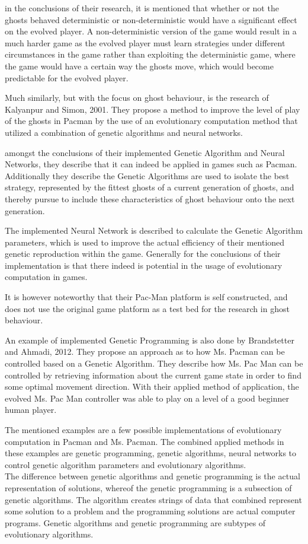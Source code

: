 in the conclusions of their research, it is mentioned that whether or not the ghosts behaved deterministic or non-deterministic would have a significant effect on the evolved player. A non-deterministic version of the game would result in a much harder game  as the evolved player must learn strategies under different circumstances in the game rather than exploiting the deterministic game, where the game would have a certain way the ghosts move, which would become predictable for the evolved player.\cite[pp. 8]{Lucas2005}

Much similarly, but with the focus on ghost behaviour, is the research of Kalyanpur and Simon, 2001. They propose a method to improve the level of play of the ghosts in Pacman by the use of an evolutionary computation method that utilized a combination of genetic algorithms and neural networks. \cite{Kalyanpur2001}

amongst the conclusions of their implemented Genetic Algorithm and Neural Networks, they describe that it can indeed be applied in games such as Pacman. Additionally they describe the Genetic Algorithms are used to isolate the best strategy, represented by the fittest ghosts of a current generation of ghosts, and thereby pursue to include these characteristics of ghost behaviour onto the next generation. \cite[pp. 8]{Kalyanpur2001}

The implemented Neural Network is described to calculate the Genetic Algorithm parameters, which is used to improve the actual efficiency of their mentioned genetic reproduction within the game. Generally for the conclusions of their implementation is that there indeed is potential in the usage of evolutionary computation in games.

It is however noteworthy that their Pac-Man platform is self constructed, and does not use the original game platform as a test bed for the research in ghost behaviour.

An example of implemented Genetic Programming is also done by Brandstetter and Ahmadi, 2012. They propose an approach as to how Ms. Pacman can be controlled based on a Genetic Algorithm.
They describe how Ms. Pac Man can be controlled by retrieving information about the current game state in order to find some optimal movement direction.
With their applied method of application, the evolved Ms. Pac Man controller was able to play on a level of a good beginner human player. \cite{Brandstetter2012}

The mentioned examples are a few possible implementations of evolutionary computation in Pacman and Ms. Pacman. The combined applied methods in these examples are genetic programming, genetic algorithms, neural networks to control genetic algorithm parameters and evolutionary algorithms.\\

The difference between genetic algorithms and genetic programming is the actual representation of solutions, whereof the genetic programming is a subsection of genetic algorithms. The algorithm creates strings of data that combined represent some solution to a problem and the programming solutions are actual computer programs.\cite{genetic}
Genetic algorithms and genetic programming are subtypes of evolutionary algorithms.

